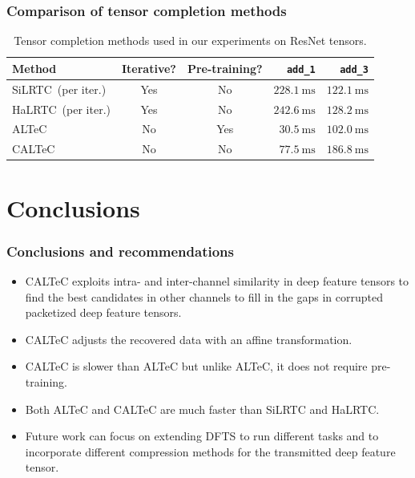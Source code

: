 \documentclass[aspectratio=169]{beamer}
\begin{document}
\begin{frame}
    \frametitle{Comparison of tensor completion methods}
    \begin{table}[b]
\caption{Tensor completion methods used in our experiments on ResNet tensors.}
\vspace{4pt}
    \label{tab:methods}
    \centering
    \begin{tabular}{l|c|c|r|r}
         Method & Iterative? & Pre-training? & \texttt{add\_1} & \texttt{add\_3} \\
         \hline
         SiLRTC~\cite{liu2012tensor}(per iter.)& Yes & No & $228.1~\mathrm{ms}$ & $122.1~\mathrm{ms}$ \\
         HaLRTC~\cite{liu2012tensor}(per iter.) & Yes & No & $242.6~\mathrm{ms}$ & $128.2~\mathrm{ms}$ \\
         ALTeC~\cite{Bragile2020} & No & Yes & $30.5~\mathrm{ms}$ & $102.0~\mathrm{ms}$ \\
         CALTeC & No & No & $77.5~\mathrm{ms}$ & $186.8~\mathrm{ms}$
    \end{tabular}
\end{table}
\end{frame}

\section{Conclusions}
\begin{frame}
	\frametitle{Conclusions and recommendations}
	\begin{itemize}
		\item CALTeC exploits intra- and inter-channel similarity in deep feature tensors to find the best candidates in other channels to fill in the gaps in corrupted packetized deep feature tensors.
		\item CALTeC adjusts the recovered data with an affine transformation.
		\item CALTeC is slower than ALTeC but unlike ALTeC, it does not require pre-training.
		\item Both ALTeC and CALTeC are much faster than SiLRTC and HaLRTC.
		\item Future work can focus on extending DFTS to run different tasks and to incorporate different compression methods for the transmitted deep feature tensor.
	\end{itemize}
\end{frame}

\end{document}

